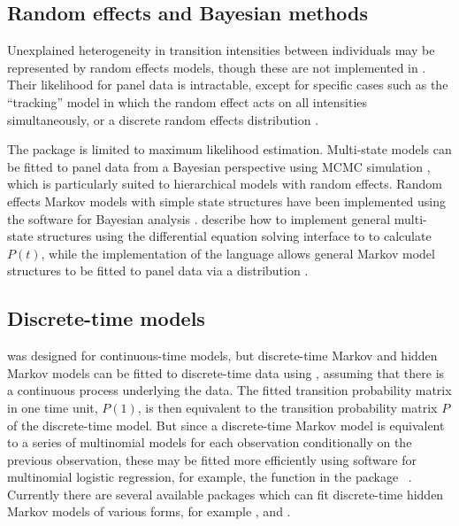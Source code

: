 \documentclass[article,shortnames]{jss}
\begin{document}
\subsection{Random effects and Bayesian methods}

Unexplained heterogeneity in transition intensities between
individuals may be represented by random effects models, though these
are not implemented in .  Their likelihood for panel data is
intractable, except for specific cases such as the ``tracking'' model
\citep{satten1999eet} in which the random effect acts on all
intensities simultaneously, or a discrete random effects distribution
\citep{cook2004cmm}.

The  package is limited to maximum likelihood estimation.
Multi-state models can be fitted to panel data from a Bayesian
perspective using MCMC simulation \citep{sharp:gibbs}, which is
particularly suited to hierarchical models with random effects.
Random effects Markov models with simple state structures have been
implemented using the  \citep{winbugs} software for Bayesian
analysis \citep{pan2007markov,ardo:biostats:re}.
\citet{welton:ades:markov} describe how to implement general
multi-state structures using the  \citep{wbdiff} differential
equation solving interface to  to calculate $P(t)$, while the
 implementation of the  language \citep{JAGS:proceedings} allows general
Markov model structures to be fitted to panel data via a distribution
.


\subsection{Discrete-time models}

 was designed for continuous-time models, but discrete-time
Markov and hidden Markov models can be fitted to discrete-time data
using , assuming that there is a continuous process
underlying the data.  The fitted transition probability matrix in one
time unit, $P(1)$, is then equivalent to the transition probability
matrix $P$ of the discrete-time model.  But since a discrete-time
Markov model is equivalent to a series of multinomial models for each
observation conditionally on the previous observation, these may be
fitted more efficiently using software for multinomial logistic
regression, for example, the function  in the
 package ~\citep{venables:ripley}.  Currently
there are several available  packages which can fit
discrete-time hidden Markov models of various forms, for example
 \citep{HiddenMarkov},  \citep{hsmm} and
 \citep{mhsmm}.
\end{document}
